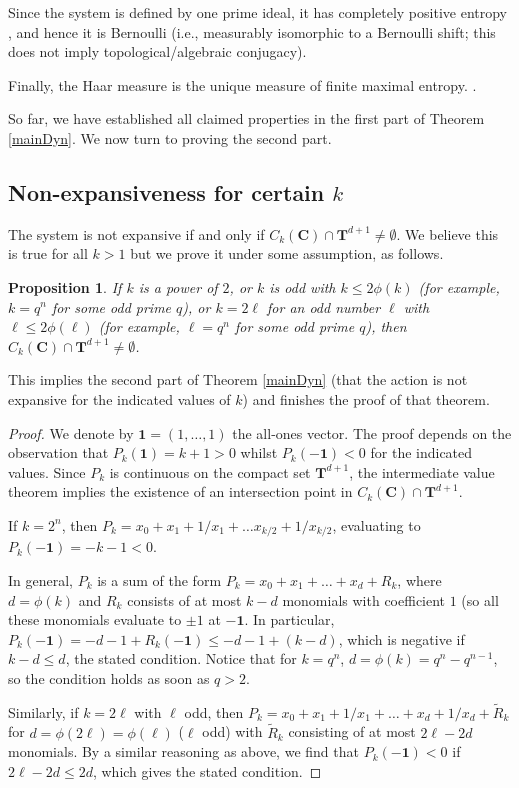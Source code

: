 \documentclass[12pt,reqno]{amsart}
\theoremstyle{definition}
\theoremstyle{plain}
\newtheorem{proposition}[theorem]{Proposition}
\theoremstyle{definition}
\newcommand{\Cc}{\mathbf{C}}
\newcommand{\T}{\mathbf{T}}
\renewcommand{\leq}{\leqslant}
\begin{document}
Since the system is defined by one prime ideal, it has completely positive entropy \cite[20.8]{Schmidt}, and hence it is Bernoulli \cite[23.1]{Schmidt} (i.e., measurably isomorphic to a Bernoulli shift; this does not imply topological/algebraic conjugacy). 

Finally, the Haar measure is the unique measure of finite maximal entropy. \cite[20.15]{Schmidt}.  

So far, we have established all claimed properties in the first part of Theorem \ref{mainDyn}. We now turn to proving the second part. 

\subsection{Non-expansiveness for certain $k$} The system is not expansive if and only if $C_k(\Cc) \cap \T^{d+1} \neq \emptyset$. We believe this is true for all $k>1$ but we prove it under some assumption, as follows. 

\begin{proposition} \label{toricpointsDS} 
If $k$ is a power of $2$, or $k$ is odd with $k \leq  2 \phi(k)$ (for example, $k=q^n$ for some odd prime $q$), or $k=2\ell$ for an odd number $\ell$ with $\ell \leq 2 \phi(\ell)$ (for example, $\ell=q^n$ for some odd prime $q$), then $C_k(\Cc) \cap \T^{d+1} \neq \emptyset$. 
\end{proposition} 

This implies the second part of Theorem \ref{mainDyn} (that the action is not expansive for the indicated values of $k$) and finishes the proof of that theorem. 

\begin{proof} We denote by $\mathbf 1 = (1,\dots,1)$ the all-ones vector. 
The proof depends on the observation that $P_k(\mathbf 1) = k+1>0$ whilst $P_k(-\mathbf 1)<0$ for the indicated values. Since $P_k$ is continuous on the compact set $\T^{d+1}$, the intermediate value theorem implies the existence of an intersection point in $C_k(\Cc) \cap \T^{d+1}$.  

If $k=2^n$, then $P_k = x_0 + x_1+1/x_1+\dots x_{k/2} + 1/x_{k/2}$, evaluating to $P_k(- \mathbf 1) = -k-1<0$. 

In general, $P_k$ is a sum of the form $P_k = x_0+x_1+\dots+x_d + R_k$, where $d=\phi(k)$ and $R_k$ consists of at most $k-d$ monomials with coefficient $1$ (so all these monomials evaluate to $\pm 1$ at $-\mathbf 1$. In particular, $P_k(- \mathbf 1) = -d-1 + R_k(-\mathbf 1) \leq -d-1+(k-d)$, which is negative if $k-d \leq d$, the stated condition. Notice that for $k=q^n$, $d=\phi(k)=q^n-q^{n-1}$, so the condition holds as soon as $q>2$. 

Similarly, if $k=2\ell$ with $\ell$ odd, then $P_k = x_0+x_1+1/x_1+\dots+x_d+1/x_d + \tilde R_k$ for $d=\phi(2\ell)=\phi(\ell)$ ($\ell$ odd) with $\tilde R_k$ consisting of at most $2 \ell - 2d$ monomials. By a similar reasoning as above, we find that $P_k(-\mathbf 1)<0$ if $2 \ell - 2 d \leq 2 d$, which gives the stated condition. 
\end{proof} 
\end{document}
